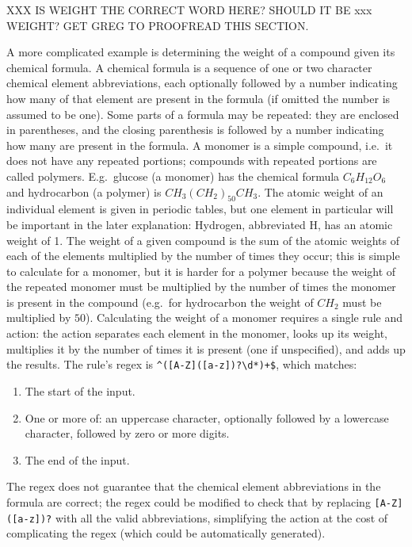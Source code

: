 XXX IS WEIGHT THE CORRECT WORD HERE\@?  SHOULD IT BE xxx WEIGHT\@?  GET
GREG TO PROOFREAD THIS SECTION\@.

A more complicated example is determining the weight of a compound given
its chemical formula.  A chemical formula is a sequence of one or two
character chemical element abbreviations, each optionally followed by a
number indicating how many of that element are present in the formula (if
omitted the number is assumed to be one).  Some parts of a formula may be
repeated: they are enclosed in parentheses, and the closing parenthesis is
followed by a number indicating how many are present in the formula.  A
monomer is a simple compound, i.e.\ it does not have any repeated portions;
compounds with repeated portions are called polymers.  E.g.\ glucose (a
monomer) has the chemical formula $C_{6}H_{12}O_{6}$ and hydrocarbon (a
polymer) is $CH_{3}{(CH_{2})}_{50}CH_{3}$.  The atomic weight of an
individual element is given in periodic tables, but one element in
particular will be important in the later explanation: Hydrogen,
abbreviated H, has an atomic weight of 1.  The weight of a given compound
is the sum of the atomic weights of each of the elements multiplied by the
number of times they occur; this is simple to calculate for a monomer, but
it is harder for a polymer because the weight of the repeated monomer must
be multiplied by the number of times the monomer is present in the compound
(e.g.\ for hydrocarbon the weight of $CH_{2}$ must be multiplied by $50$).
Calculating the weight of a monomer requires a single rule and action: the
action separates each element in the monomer, looks up its weight,
multiplies it by the number of times it is present (one if unspecified),
and adds up the results.  The rule's regex is \verb!^([A-Z]([a-z])?\d*)+$!,
which matches:

\begin{enumerate}

    \squeezeitems{}

    \item The start of the input.

    \item One or more of: an uppercase character, optionally followed by a
        lowercase character, followed by zero or more digits.

    \item The end of the input.

\end{enumerate}

The regex does not guarantee that the chemical element abbreviations in the
formula are correct; the regex could be modified to check that by replacing
\verb![A-Z]([a-z])?! with all the valid abbreviations, simplifying the
action at the cost of complicating the regex (which could be automatically
generated).

